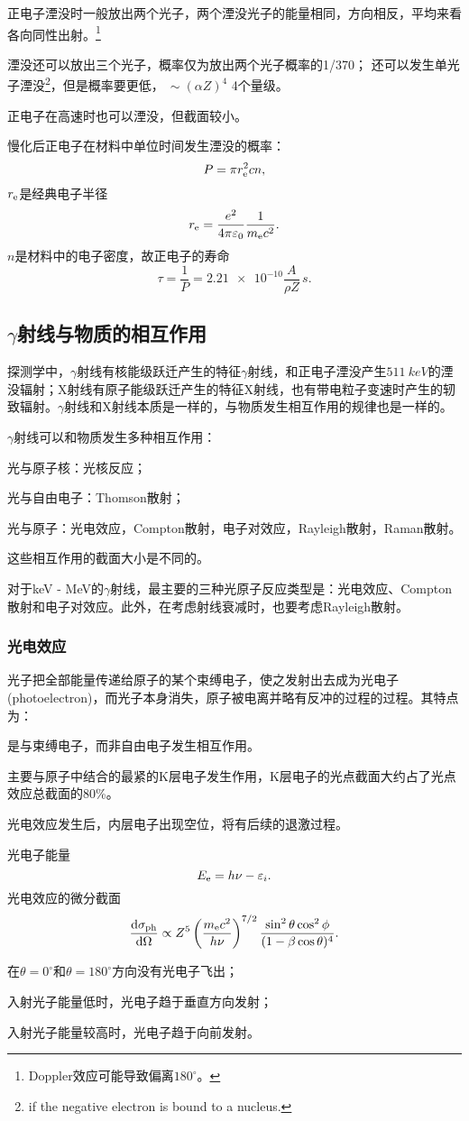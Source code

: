 正电子湮没时一般放出两个光子，两个湮没光子的能量相同，方向相反，平均来看各向同性出射。\footnote{Doppler效应可能导致偏离$180^\circ$。}

湮没还可以放出三个光子，概率仅为放出两个光子概率的1/370；
还可以发生单光子湮没\footnote{if the negative electron is bound to a nucleus.}，但是概率要更低，$~\sim(\alpha Z)^4$ 4个量级。

正电子在高速时也可以湮没，但截面较小。

慢化后正电子在材料中单位时间发生湮没的概率：
\[
	P=\pi r_\mathrm e^2cn,
\]
$r_\mathrm e$是经典电子半径
\[
	r_\mathrm e=\frac{e^2}{4\pi\varepsilon_0}\frac1{m_\mathrm e c^2}.
\]
$n$是材料中的电子密度，故正电子的寿命
\[
	\tau=\frac1P=\num{2.21e-10}\frac{A}{\rho Z}\,\si{s}.
\]
\subsection[\textit{\textgamma}射线与物质的相互作用]{$\gamma$射线与物质的相互作用}
探测学中，$\gamma$射线有核能级跃迁产生的特征$\gamma$射线，和正电子湮没产生$\SI{511}{keV}$的湮没辐射；X射线有原子能级跃迁产生的特征X射线，也有带电粒子变速时产生的轫致辐射。$\gamma$射线和X射线本质是一样的，与物质发生相互作用的规律也是一样的。

$\gamma$射线可以和物质发生多种相互作用：
\begin{compactitem}
	\item 光与原子核：光核反应；
	\item 光与自由电子：Thomson散射；
	\item 光与原子：光电效应，Compton散射，电子对效应，Rayleigh散射，Raman散射。
\end{compactitem}
这些相互作用的截面大小是不同的。

对于keV - MeV的$\gamma$射线，最主要的三种光原子反应类型是：光电效应、Compton散射和电子对效应。此外，在考虑射线衰减时，也要考虑Rayleigh散射。
\subsubsection{光电效应}
光子把全部能量传递给原子的某个束缚电子，使之发射出去成为光电子(photoelectron)，而光子本身消失，原子被电离并略有反冲的过程的过程。其特点为：
\begin{compactenum}
	\item 是与束缚电子，而非自由电子发生相互作用。
	\item 主要与原子中结合的最紧的K层电子发生作用，K层电子的光点截面大约占了光点效应总截面的80\%。
	\item 光电效应发生后，内层电子出现空位，将有后续的退激过程。
\end{compactenum}
光电子能量 
\[
	E_\mathrm e=h\nu-\varepsilon_i.
\]
光电效应的微分截面
\[
	\frac{\mathrm{d}^{\;\!\!}\sigma_{\mathrm{ph}}}{\mathrm{d} \Omega^{\;\!\!}}\propto Z^5\left(\frac{m_\mathrm e c^2}{h\nu}\right)^{7/2}\frac{\sin^2\theta\cos^2\phi}{(1-\beta\cos\theta)^4}.
\]
\begin{compactenum}
	\item 在$\theta=0^\circ$和$\theta=180^\circ$方向没有光电子飞出；
	\item 入射光子能量低时，光电子趋于垂直方向发射；
	\item 入射光子能量较高时，光电子趋于向前发射。
\end{compactenum}

